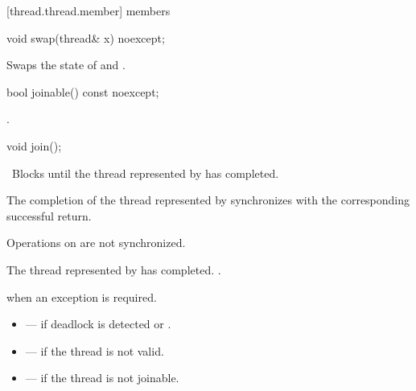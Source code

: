 [thread.thread.member]{ members}

%
\begin{itemdecl}
void swap(thread& x) noexcept;
\end{itemdecl}

\begin{itemdescr}
\pnum
\effects Swaps the state of  and .
\end{itemdescr}

%
\begin{itemdecl}
bool joinable() const noexcept;
\end{itemdecl}

\begin{itemdescr}
\pnum
\returns {}.
\end{itemdescr}

%
\begin{itemdecl}
void join();
\end{itemdecl}

\begin{itemdescr}
\pnum
\effects\ Blocks until the thread represented by  has completed.

\pnum
\sync The completion of the thread represented by  synchronizes with
the corresponding successful
 return. \begin{note} Operations on
 are not synchronized. \end{note}

\pnum
\postconditions The thread represented by  has completed. .

\pnum
\throws {} when
an exception is required.

\pnum
\errors
\begin{itemize}
\item {} --- if deadlock is detected or
.

\item {} --- if the thread is not valid.

\item {} --- if the thread is not joinable.
\end{itemize}
\end{itemdescr}

